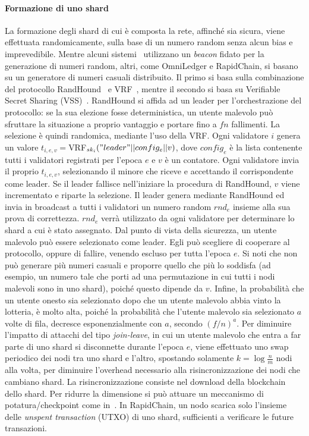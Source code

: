 \paragraph*{Formazione di uno shard}
La formazione degli shard di cui è composta la rete, affinché sia sicura, viene effettuata randomicamente, sulla base di un numero random senza alcun bias e imprevedibile. Mentre alcuni sistemi~ utilizzano un \emph{beacon} fidato per la generazione di numeri random, altri, come OmniLedger e RapidChain, si basano su un generatore di numeri casuali distribuito. Il primo si basa sulla combinazione del protocollo RandHound~\cite{syta2017scalable} e VRF~\cite{micali1999verifiable}, mentre il secondo si basa su Verifiable Secret Sharing (VSS)~\cite{pedersen1991non}.
RandHound si affida ad un leader per l'orchestrazione del protocollo: se la sua elezione fosse deterministica, un utente malevolo può sfruttare la situazione a proprio vantaggio e portare fino a $fn$ fallimenti. La selezione è quindi randomica, mediante l'uso della VRF. Ogni validatore $i$ genera un valore $t_{i,e,v} =$VRF$_{sk_i}("leader" || config_e || v)$, dove $config_e$  è la lista contenente tutti i validatori registrati per l'epoca $e$ e $v$ è un contatore. Ogni validatore invia il proprio $t_{i,e,v}$, selezionando il minore che riceve e accettando il corrispondente come leader. Se il leader fallisce nell'iniziare la procedura di RandHound, $v$ viene incrementato e riparte la selezione. Il leader genera mediante RandHound ed invia in broadcast a tutti i validatori un numero random $rnd_e$ insieme alla sua prova di correttezza. $rnd_e$ verrà utilizzato da ogni validatore per determinare lo shard a cui è stato assegnato.
Dal punto di vista della sicurezza, un utente malevolo può essere selezionato come leader. Egli può scegliere di cooperare al protocollo, oppure di fallire, venendo escluso per tutta l'epoca $e$. Si noti che non può generare più numeri casuali e proporre quello che più lo soddisfa (ad esempio, un numero tale che porti ad una permutazione in cui tutti i nodi malevoli sono in uno shard), poiché questo dipende da $v$. Infine, la probabilità che un utente onesto sia selezionato dopo che un utente malevolo abbia vinto la lotteria, è molto alta, poiché la probabilità che l'utente malevolo sia selezionato $a$ volte di fila, decresce esponenzialmente con $a$, secondo $(f/n)^a$.
Per diminuire l'impatto di attacchi del tipo \emph{join-leave}, in cui un utente malevolo che entra a far parte di uno shard si disconnette durante l'epoca $e$, viene effettuato uno swap periodico dei nodi tra uno shard e l'altro, spostando solamente $k = \log \frac{n}{m}$ nodi alla volta, per diminuire l'overhead necessario alla risincronizzazione dei nodi che cambiano shard. La risincronizzazione consiste nel download della blockchain dello shard. Per ridurre la dimensione si può attuare un meccanismo di potatura/checkpoint come in~\cite{bernardini2019blockchains, kokoris2018omniledger, leung2019vault}. In RapidChain, un nodo scarica solo l'insieme delle \emph{unspent transaction} (UTXO) di uno shard, sufficienti a verificare le future transazioni.

